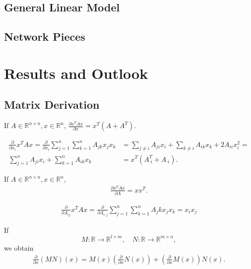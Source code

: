 \documentclass[a4paper,11pt]{report}
\begin{document}
\section{General Linear Model}

\section{Network Pieces}

\chapter{Results and Outlook}

\printbibliography

\begin{appendices}
\chapter{Matrix Derivation}\label{ch:matrix-derivation}
\begin{Lem}\label{derivation-quadratic-form}
If $A\in\mathbb{R}^{n\times n},x\in\mathbb{R}^n$, $\frac{\partial x^TAx}{\partial x}=x^T(A+A^T)$.
\end{Lem}

\begin{Bew}
\begin{align*}
\frac{\partial}{\partial x_i}x^TAx=\frac{\partial}{\partial x_i}\sum_{j=1}^n\sum_{k=1}^nA_{jk}x_jx_k&=\sum_{j\ne i}A_{ji}x_i+\sum_{k\ne i}A_{ik}x_k+2A_{ii}x_i^2=\\
\sum_{j=1}^nA_{ji}x_i+\sum_{k=1}^nA_{ik}x_k&=x^T(A_{\cdot i}^T+A_{\cdot i}).
\end{align*}
\end{Bew}

\begin{Lem}\label{derivation-matrix-quadratic-form}
If $A\in\mathbb{R}^{n\times n},x\in\mathbb{R}^n$,
\begin{align*}
\frac{\partial x^TAx}{\partial A}=xx^T.
\end{align*}
\end{Lem}

\begin{Bew}
\begin{align*}
\frac{\partial}{\partial{A_{ij}}}x^TAx=\frac{\partial}{\partial{A_{i,j}}}\sum_{j=1}^n\sum_{k=1}^nA_jkx_jx_k=x_ix_j
\end{align*}
\end{Bew}

\begin{Lem}\label{product-rule}
If
\[
M:\mathbb{R}\to\mathbb{R}^{l\times m},
\quad
N:\mathbb{R}\to\mathbb{R}^{m\times n},
\]
we obtain
\begin{align*}
\frac{\partial}{\partial x}(MN)(x)=M(x)\left(\frac{\partial}{\partial x}N(x)\right)+\left(\frac{\partial}{\partial x}M(x)\right)N(x).
\end{align*}
\end{Lem}


\end{appendices}
\end{document}
